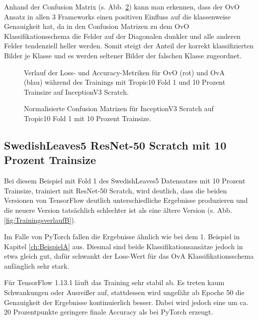 Anhand der Confusion Matrix (s. Abb. \ref{fig:ConfusionMatrixA}) kann man erkennen, dass der OvO Ansatz in allen 3 Frameworks einen positiven Einfluss auf die klassenweise Genauigkeit hat, da in den Confusion Matrizen zu dem OvO Klassifikationsschema die Felder auf der Diagonalen dunkler und alle anderen Felder tendenziell heller werden. Somit steigt der Anteil der korrekt klassifizierten Bilder je Klasse und es werden seltener Bilder der falschen Klasse zugeordnet.
\begin{figure}[H]
\begin{adjustbox}{width=1.4\textwidth, center}

\end{adjustbox}
\caption{Verlauf der Loss- und Accuracy-Metriken für OvO (rot) und OvA (blau) während des Trainings mit Tropic10 Fold 1 und 10 Prozent Trainsize auf InceptionV3 Scratch.}
\label{fig:TrainingsverlaufA}
\end{figure}

\begin{figure}[H]
\begin{adjustbox}{width=1.1\textwidth, center}

\end{adjustbox}
\caption{Normalisierte Confusion Matrizen für InceptionV3 Scratch auf Tropic10 Fold 1 mit 10 Prozent Trainsize.}
\label{fig:ConfusionMatrixA}
\end{figure}

\subsection{SwedishLeaves5 ResNet-50 Scratch mit 10 Prozent Trainsize}
\label{ch:BeispielB}
Bei diesem Beispiel mit Fold 1 des SwedishLeaves5 Datensatzes mit 10 Prozent Trainsize, trainiert mit ResNet-50 Scratch, wird deutlich, dass die beiden Versionen von TensorFlow \cite{tensorflow} deutlich unterschiedliche Ergebnisse produzieren und die neuere Version tatsächlich schlechter ist als eine ältere Version (s. Abb. \ref{fig:TrainingsverlaufB}).

Im Falle von PyTorch \cite{pytorch} fallen die Ergebnisse ähnlich wie bei dem 1. Beispiel in Kapitel \ref{ch:BeispielA} aus. Diesmal sind beide Klassifikationsansätze jedoch in etwa gleich gut, dafür schwankt der Loss-Wert für das OvA Klassifikationsschema anfänglich sehr stark.

Für TensorFlow 1.13.1 \cite{tensorflow} läuft das Training sehr stabil ab. Es treten kaum Schwankungen oder Ausreißer auf, stattdessen wird ungefähr ab Epoche 50 die Genauigkeit der Ergebnisse kontinuierlich besser. Dabei wird jedoch eine um ca. 20 Prozentpunkte geringere finale Accuracy als bei PyTorch \cite{pytorch} erzeugt.


